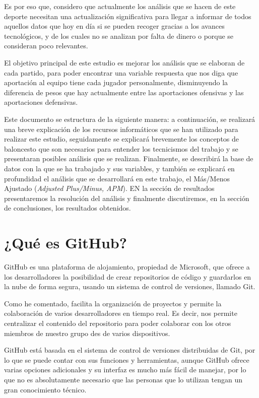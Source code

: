 \documentclass[paper=a4, fontsize=9pt]{article}
\begin{document}
Es por eso que, considero que actualmente los análisis que se hacen de este deporte necesitan una actualización significativa para llegar a informar de todos aquellos datos que hoy en día si se pueden recoger gracias a los avances tecnológicos, y de los cuales no se analizan por falta de dinero o porque se consideran poco relevantes.

El objetivo principal de este estudio es mejorar los análisis que se elaboran de cada partido, para poder encontrar una variable respuesta que nos diga que aportación al equipo tiene cada jugador personalmente, disminuyendo la diferencia de pesos que hay actualmente entre las aportaciones ofensivas y las aportaciones defensivas.

Este documento se estructura de la siguiente manera: a continuación, se realizará una breve explicación de los recursos informáticos que se han utilizado para realizar este estudio, seguidamente se explicará brevemente los conceptos de baloncesto que son necesarios para entender los tecnicismos del trabajo y se presentaran posibles análisis que se realizan. Finalmente, se describirá la base de datos con la que se ha trabajado y sus variables, y también se explicará en profundidad el análisis que se desarrollará en este trabajo, el Más/Menos Ajustado (\emph{Adjusted Plus/Minus, APM}). EN la sección de resultados presentaremos la resolución del análisis y finalmente discutiremos, en la sección de conclusiones, los resultados obtenidos.

\section{¿Qué es GitHub?}

GitHub es una plataforma de alojamiento, propiedad de Microsoft, que ofrece a los desarrolladores la posibilidad de crear repositorios de código y guardarlos en la nube de forma segura, usando un sistema de control de versiones, llamado Git.

Como he comentado, facilita la organización de proyectos y permite la colaboración de varios desarrolladores en tiempo real. Es decir, nos permite centralizar el contenido del repositorio para poder colaborar con los otros miembros de nuestro grupo des de varios dispositivos.

GitHub está basada en el sistema de control de versiones distribuidas de Git, por lo que se puede contar con sus funciones y herramientas, aunque GitHub ofrece varias opciones adicionales y su interfaz es mucho más fácil de manejar, por lo que no es absolutamente necesario que las personas que lo utilizan tengan un gran conocimiento técnico.
\end{document}
